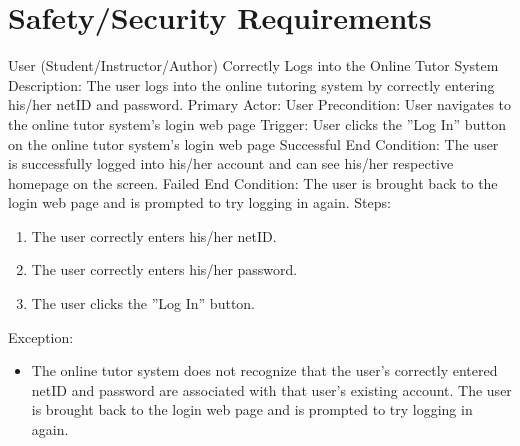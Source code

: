 
\chapter{Safety/Security Requirements}
    
    \begin{section}{User (Student/Instructor/Author) Correctly Logs into the Online Tutor System}
        Description: The user logs into the online tutoring system by correctly entering his/her netID and password. \newline
        Primary Actor: User \newline
        Precondition: User navigates to the online tutor system's login web page \newline
        Trigger: User clicks the ''Log In'' button on the online tutor system's login web page \newline
        Successful End Condition: The user is successfully logged into his/her account and can see his/her respective homepage on the screen. \newline
        Failed End Condition: The user is brought back to the login web page and is prompted to try logging in again. \newline
        \newline
        Steps:
        \begin{enumerate}
            \item{The user correctly enters his/her netID.}
            \item{The user correctly enters his/her password.}
            \item{The user clicks the ''Log In'' button.}
        \end{enumerate}
        Exception:
        \begin{itemize}
            \item{The online tutor system does not recognize that the user's correctly entered netID and password are associated with that user's existing account.
            The user is brought back to the login web page and is prompted to try logging in again.}
        \end{itemize}
    \end{section}
    
